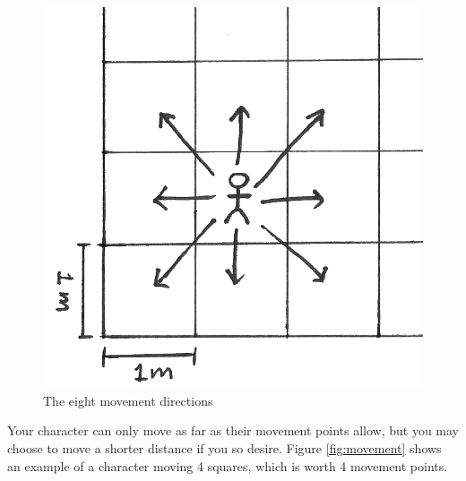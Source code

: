 \begin{figure}
    \centering
    \includegraphics{graphics/directions-trans.png}
    \caption{The eight movement directions}
    \label{fig:directions}
\end{figure}

Your character can only move as far as their movement points allow, but you may choose to move a shorter distance if you so desire. Figure \ref{fig:movement} shows an example of a character moving 4 squares, which is worth 4 movement points.

